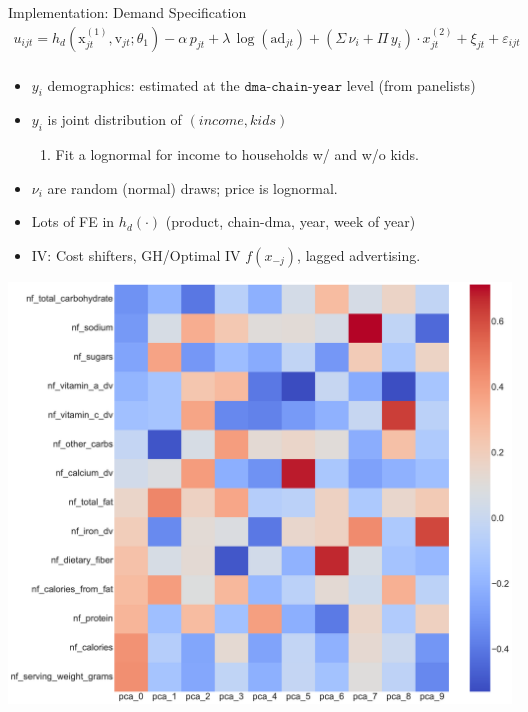 \documentclass[handout, serif, aspectratio=169, 10pt]{beamer}
\begin{document}
\begin{frame}{Implementation: Demand Specification}
\begin{gather*}
u_{ijt} =  h_d(\textrm{x}_{jt}^{(1)}, \textrm{v}_{jt}; \theta_1) - \alpha\, p_{jt} + \lambda \, \log(\text{ad}_{jt})  + \left(\Sigma \, \nu_i + \Pi\, y_i \right) \cdot x_{jt}^{(2)}+ \xi_{jt} + \varepsilon_{ijt}\\
\end{gather*}
\vspace{-0.75cm}
\begin{itemize}
\item $y_i$ demographics: estimated at the $\texttt{dma-chain-year}$ level (from panelists)
\item $y_i$ is joint distribution of $(income, kids)$
\begin{enumerate}
\item Fit a lognormal for income to households w/ and w/o kids.
\end{enumerate}
\item $\nu_i$ are random (normal) draws; price is lognormal.
\item Lots of FE in $h_d(\cdot)$ (product, chain-dma, year, week of year)
\item IV: Cost shifters, GH/Optimal IV $f(x_{-j})$, lagged advertising.
\end{itemize}
\end{frame}

\begin{frame}[plain]
\begin{center}
\includegraphics[height = \textheight ]{figures/pca_coeff.pdf}
\end{center}
\end{frame}
\end{document}

